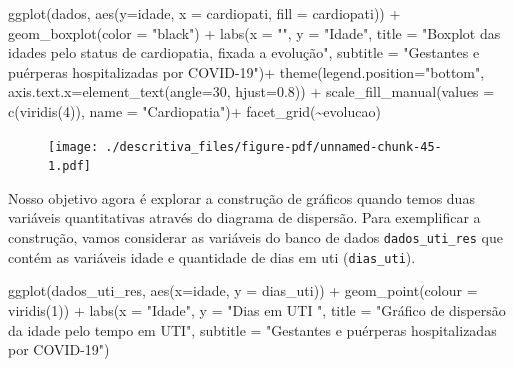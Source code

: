 \documentclass[
  letterpaper,
  DIV=11,
  numbers=noendperiod]{scrreprt}
\newenvironment{Shaded}{\begin{snugshade}}{\end{snugshade}}
\newcommand{\AttributeTok}[1]{\textcolor[rgb]{0.40,0.45,0.13}{#1}}
\newcommand{\DecValTok}[1]{\textcolor[rgb]{0.68,0.00,0.00}{#1}}
\newcommand{\FloatTok}[1]{\textcolor[rgb]{0.68,0.00,0.00}{#1}}
\newcommand{\FunctionTok}[1]{\textcolor[rgb]{0.28,0.35,0.67}{#1}}
\newcommand{\NormalTok}[1]{\textcolor[rgb]{0.00,0.23,0.31}{#1}}
\newcommand{\SpecialCharTok}[1]{\textcolor[rgb]{0.37,0.37,0.37}{#1}}
\newcommand{\StringTok}[1]{\textcolor[rgb]{0.13,0.47,0.30}{#1}}
\begin{document}
\begin{Shaded}
\begin{Highlighting}[]
\FunctionTok{ggplot}\NormalTok{(dados, }\FunctionTok{aes}\NormalTok{(}\AttributeTok{y=}\NormalTok{idade, }\AttributeTok{x =}\NormalTok{ cardiopati, }\AttributeTok{fill =}\NormalTok{ cardiopati))  }\SpecialCharTok{+} 
  \FunctionTok{geom\_boxplot}\NormalTok{(}\AttributeTok{color =} \StringTok{"black"}\NormalTok{) }\SpecialCharTok{+}
  \FunctionTok{labs}\NormalTok{(}\AttributeTok{x =} \StringTok{""}\NormalTok{, }\AttributeTok{y =} \StringTok{"Idade"}\NormalTok{, }\AttributeTok{title =} \StringTok{"Boxplot das idades pelo status de cardiopatia, fixada a evolução"}\NormalTok{, }\AttributeTok{subtitle =} \StringTok{"Gestantes e puérperas hospitalizadas por COVID{-}19"}\NormalTok{)}\SpecialCharTok{+}
  \FunctionTok{theme}\NormalTok{(}\AttributeTok{legend.position=}\StringTok{"bottom"}\NormalTok{, }\AttributeTok{axis.text.x=}\FunctionTok{element\_text}\NormalTok{(}\AttributeTok{angle=}\DecValTok{30}\NormalTok{, }\AttributeTok{hjust=}\FloatTok{0.8}\NormalTok{)) }\SpecialCharTok{+}
  \FunctionTok{scale\_fill\_manual}\NormalTok{(}\AttributeTok{values =} \FunctionTok{c}\NormalTok{(}\FunctionTok{viridis}\NormalTok{(}\DecValTok{4}\NormalTok{)), }\AttributeTok{name =} \StringTok{"Cardiopatia"}\NormalTok{)}\SpecialCharTok{+}
  \FunctionTok{facet\_grid}\NormalTok{(}\SpecialCharTok{\textasciitilde{}}\NormalTok{evolucao)}
\end{Highlighting}
\end{Shaded}

\begin{figure}[H]

{\centering \texttt{[image: ./descritiva\_files/figure-pdf/unnamed-chunk-45-1.pdf]}

}

\end{figure}

Nosso objetivo agora é explorar a construção de gráficos quando temos
duas variáveis quantitativas através do diagrama de dispersão. Para
exemplificar a construção, vamos considerar as variáveis do banco de
dados \texttt{dados\_uti\_res} que contém as variáveis idade e
quantidade de dias em uti (\texttt{dias\_uti}).

\begin{Shaded}
\begin{Highlighting}[]
\FunctionTok{ggplot}\NormalTok{(dados\_uti\_res, }\FunctionTok{aes}\NormalTok{(}\AttributeTok{x=}\NormalTok{idade, }\AttributeTok{y =}\NormalTok{ dias\_uti))  }\SpecialCharTok{+} 
  \FunctionTok{geom\_point}\NormalTok{(}\AttributeTok{colour =} \FunctionTok{viridis}\NormalTok{(}\DecValTok{1}\NormalTok{)) }\SpecialCharTok{+}
  \FunctionTok{labs}\NormalTok{(}\AttributeTok{x =} \StringTok{"Idade"}\NormalTok{, }\AttributeTok{y =} \StringTok{"Dias em UTI "}\NormalTok{, }\AttributeTok{title =} \StringTok{"Gráfico de dispersão da idade pelo tempo em UTI"}\NormalTok{, }\AttributeTok{subtitle =} \StringTok{"Gestantes e puérperas hospitalizadas por COVID{-}19"}\NormalTok{)}
\end{Highlighting}
\end{Shaded}
\end{document}
